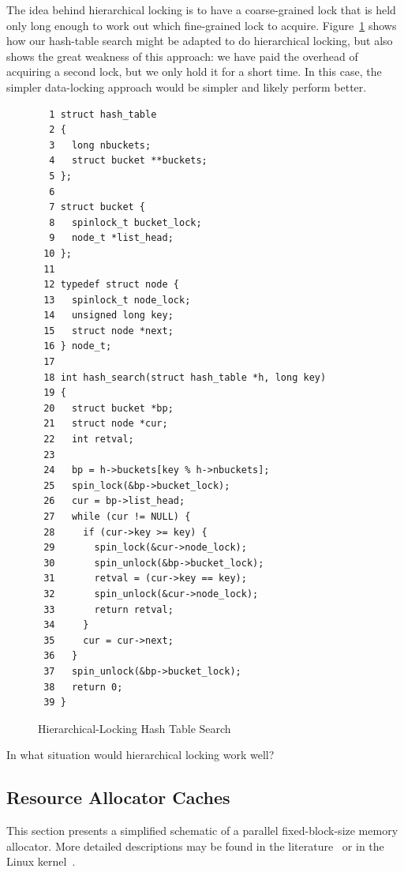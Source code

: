 The idea behind hierarchical locking is to have a coarse-grained lock
that is held only long enough to work out which fine-grained lock
to acquire.
Figure~\ref{fig:SMPdesign:Hierarchical-Locking Hash Table Search}
shows how our hash-table search might be adapted to do hierarchical
locking, but also shows the great weakness of this approach:
we have paid the overhead of acquiring a second lock, but we only
hold it for a short time.
In this case, the simpler data-locking approach would be simpler
and likely perform better.

\begin{figure}[htbp]
{ \scriptsize
\begin{verbatim}
  1 struct hash_table
  2 {
  3   long nbuckets;
  4   struct bucket **buckets;
  5 };
  6
  7 struct bucket {
  8   spinlock_t bucket_lock;
  9   node_t *list_head;
 10 };
 11
 12 typedef struct node {
 13   spinlock_t node_lock;
 14   unsigned long key;
 15   struct node *next;
 16 } node_t;
 17
 18 int hash_search(struct hash_table *h, long key)
 19 {
 20   struct bucket *bp;
 21   struct node *cur;
 22   int retval;
 23
 24   bp = h->buckets[key % h->nbuckets];
 25   spin_lock(&bp->bucket_lock);
 26   cur = bp->list_head;
 27   while (cur != NULL) {
 28     if (cur->key >= key) {
 29       spin_lock(&cur->node_lock);
 30       spin_unlock(&bp->bucket_lock);
 31       retval = (cur->key == key);
 32       spin_unlock(&cur->node_lock);
 33       return retval;
 34     }
 35     cur = cur->next;
 36   }
 37   spin_unlock(&bp->bucket_lock);
 38   return 0;
 39 }
\end{verbatim}
}
\caption{Hierarchical-Locking Hash Table Search}
\label{fig:SMPdesign:Hierarchical-Locking Hash Table Search}
\end{figure}

\QuickQuiz{}
	In what situation would hierarchical locking work well?
 \QuickQuizEnd

\subsection{Resource Allocator Caches}
\label{sec:SMPdesign:Resource Allocator Caches}

This section presents a simplified schematic of a parallel fixed-block-size
memory allocator.
More detailed descriptions may be found in the
literature~\cite{McKenney92a,McKenney93,Bonwick01slab,McKenney01e}
or in the Linux kernel~\cite{Torvalds2.6kernel}.

